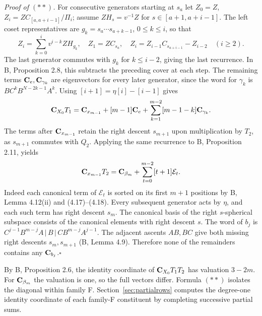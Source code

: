 \smallskip
\noindent\textit{Proof of $(**)$.} For consecutive generators starting at
$s_a$ let $Z_0=Z$, $Z_i=Z C_{[a,a+i-1]}/\Pi_i$; assume $ZH_s=v^{-1}Z$
for $s\in[a+1,a+i-1]$. The left coset representatives are
$g_k=s_a\cdots s_{a+k-1}$, $0\le k\le i$, so that
\[
 Z_i=\sum_{k=0}^i v^{i-k}ZH_{g_k},
 \quad Z_1=ZC_{s_a},\quad
 Z_i=Z_{i-1}C_{s_{a+i-1}}-Z_{i-2}\quad(i\ge2).
\]
The last generator commutes with $g_k$ for $k\le i-2$, giving the
last recurrence. In B, Proposition 2.8, this subtracts the preceding
cover at each step. The remaining terms $\mathbf C_e,\mathbf C_{\gamma_k}$ are
eigenvectors for every later generator, since the word for $\gamma_k$
is $BC^kB^{N-2k-1}A^k$. Using $[i+1]=\eta[i]-[i-1]$ gives
\[
 \mathbf C_{X_0}T_1=\mathbf C_{x_{m-1}}+[m-1]\mathbf C_e+
             \sum_{k=1}^{m-2}[m-1-k]\mathbf C_{\gamma_k}.
\]
The terms after $\mathbf C_{x_{m-1}}$ retain the right descent $s_{m+1}$
upon multiplication by $T_2$, as $s_{m+1}$ commutes with $Q_2$.
Applying the same recurrence to B, Proposition 2.11, yields
\[
 \mathbf C_{x_{m-1}}T_2=\mathbf C_{\beta_m}+\sum_{t=0}^{m-2}[t+1]\mathcal E_t .
\]
Indeed each canonical term of $\mathcal E_t$ is sorted on its first
$m+1$ positions by B, Lemma 4.12(ii) and (4.17)--(4.18). Every
subsequent generator acts by $\eta$, and each such term has right
descent $s_m$. The canonical basis of the right $s$-spherical
subspace consists of the canonical elements with right descent $s$.
The word of $b_j$ is
$C^{j-1}B^{m-j}A\,|\,B\,|\,CB^{m-j}A^{j-1}$.
The adjacent ascents $AB,BC$ give both missing right descents
$s_m,s_{m+1}$ (B, Lemma 4.9). Therefore none of the remainders
contains any $\mathbf C_{b_j}$.\hfill$\square$

\smallskip
By B, Proposition 2.6, the identity coordinate of $\mathbf C_{X_0}T_1T_2$
has valuation $3-2m$. For $\mathbf C_{\beta_m}$ the valuation is one, so the
full vectors differ. Formula $(**)$ isolates the diagonal within family F.
Section~\ref{sec:partialrows} computes the degree-one identity coordinate
of each family-F constituent by completing successive partial sums.
